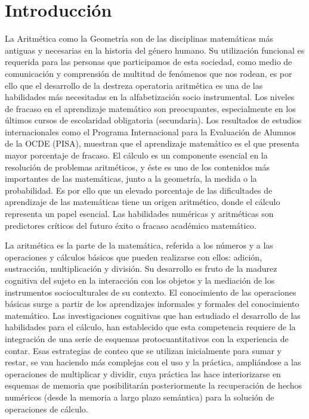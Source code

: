 \documentclass{article}
\begin{document}
\section{Introducción}
La Aritmética como la Geometría son de las disciplinas matemáticas más antiguas y 
necesarias en la historia del género humano\cite{coronado2014estudio}. Su utilización 
funcional es requerida para las personas que participamos de esta sociedad, como 
medio de comunicación y comprensión de multitud de fenómenos que nos rodean, es por 
ello que el desarrollo de la destreza operatoria aritmética es una de las habilidades 
más necesitadas en la alfabetización socio instrumental. Los niveles de fracaso en el 
aprendizaje matemático son preocupantes, especialmente en los últimos cursos de 
escolaridad obligatoria (secundaria).  Los resultados de estudios internacionales 
como el Programa Internacional para la Evaluación de Alumnos de la OCDE 
(PISA)\cite{oecd2014what,oecd2016low}, muestran que el aprendizaje matemático es el 
que presenta mayor porcentaje de fracaso\cite{coronado2016academic, mullis2016timss}. 
El cálculo es un componente esencial en la resolución de problemas aritméticos, 
y éste es uno de los contenidos más importantes de las matemáticas, junto a la geometría, 
la medida o la probabilidad. Es por ello que un elevado porcentaje de las dificultades de 
aprendizaje de las matemáticas tiene un origen aritmético, donde el cálculo representa un 
papel esencial\cite{orrantia2006dificultades}.  Las habilidades numéricas y aritméticas 
son predictores críticos del futuro éxito o fracaso académico 
matemático\cite{rodriguez2017marcadores}.  


La aritmética es la parte de la matemática, referida a los números y a las operaciones 
y cálculos básicos que pueden realizarse con ellos: adición, sustracción, multiplicación 
y división. Su desarrollo es fruto de la madurez cognitiva del sujeto en la interacción 
con los objetos y la mediación de los instrumentos socioculturales de su contexto.  
El conocimiento de las operaciones básicas surge a partir de los aprendizajes informales 
y formales del conocimiento matemático. Las investigaciones cognitivas que han estudiado el 
desarrollo de las habilidades para el cálculo, han establecido que esta competencia requiere 
de la integración de una serie de esquemas protocuantitativos\cite{resnick1989developing,resnick1987learning}
con la experiencia de contar\cite{fuson1992research}.  Esas estrategias de conteo que 
se utilizan inicialmente para sumar y restar, se van haciendo más complejas con el uso 
y la práctica, ampliándose a las operaciones de multiplicar y dividir, cuya práctica las 
hace interiorizarse en esquemas de memoria que posibilitarán posteriormente la recuperación 
de hechos numéricos (desde la memoria a  largo plazo semántica) para la solución de operaciones 
de cálculo\cite{fuson1992research,godino2009sentido,fuson1988children}.
\end{document}
